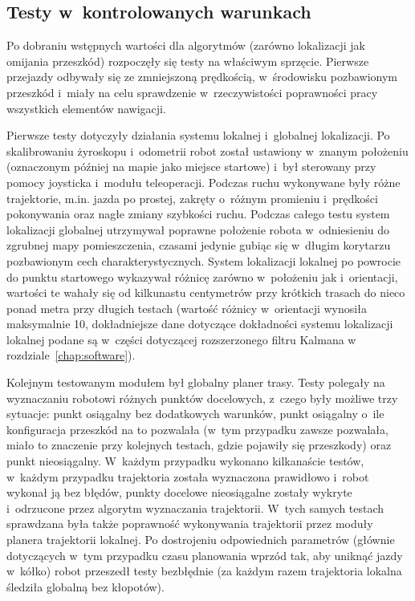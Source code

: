 \subsection{Testy w~kontrolowanych warunkach}

Po dobraniu wstępnych wartości dla algorytmów (zarówno lokalizacji jak
omijania przeszkód) rozpoczęły się testy na właściwym sprzęcie. Pierwsze
przejazdy odbywały się ze zmniejszoną prędkością, w~środowisku pozbawionym
przeszkód i~miały na celu sprawdzenie w~rzeczywistości poprawności pracy
wszystkich elementów nawigacji.

Pierwsze testy dotyczyły działania systemu lokalnej i~globalnej lokalizacji.
Po skalibrowaniu żyroskopu i~odometrii robot został ustawiony w~znanym położeniu
(oznaczonym później na mapie jako miejsce startowe) i~był sterowany przy pomocy
joysticka i~modułu teleoperacji. Podczas ruchu wykonywane były różne trajektorie,
m.in. jazda po prostej, zakręty o~różnym promieniu i~prędkości pokonywania
oraz nagłe zmiany szybkości ruchu. Podczas całego testu system lokalizacji
globalnej utrzymywał poprawne położenie robota w~odniesieniu do zgrubnej mapy
pomieszczenia, czasami jedynie gubiąc się w~długim korytarzu pozbawionym
cech charakterystycznych. System lokalizacji lokalnej po powrocie do punktu
startowego wykazywał różnicę zarówno w~położeniu jak i~orientacji, wartości
te wahały się od kilkunastu centymetrów przy krótkich trasach do nieco ponad
metra przy długich testach (wartość różnicy w~orientacji wynosiła maksymalnie 10\textdegree,
dokładniejsze dane dotyczące dokładności systemu lokalizacji lokalnej podane
są w~części dotyczącej rozszerzonego filtru Kalmana w rozdziale~\ref{chap:software}).

Kolejnym testowanym modułem był globalny planer trasy. Testy polegały na
wyznaczaniu robotowi różnych punktów docelowych, z~czego były możliwe
trzy sytuacje: punkt osiągalny bez dodatkowych warunków, punkt osiągalny
o~ile konfiguracja przeszkód na to pozwalała (w~tym przypadku zawsze pozwalała,
miało to znaczenie przy kolejnych testach, gdzie pojawiły się przeszkody)
oraz punkt nieosiągalny. W~każdym przypadku wykonano kilkanaście testów,
w~każdym przypadku trajektoria została wyznaczona prawidłowo i~robot wykonał
ją bez błędów, punkty docelowe nieosiągalne zostały wykryte i~odrzucone przez
algorytm wyznaczania trajektorii. W~tych samych testach sprawdzana była także
poprawność wykonywania trajektorii przez moduły planera trajektorii lokalnej.
Po dostrojeniu odpowiednich parametrów (głównie dotyczących w~tym przypadku
czasu planowania wprzód tak, aby uniknąć jazdy w~kółko) robot przeszedł
testy bezbłędnie (za każdym razem trajektoria lokalna śledziła globalną
bez kłopotów).

